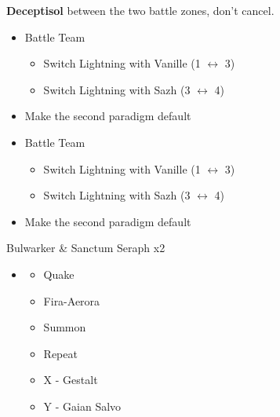 \begin{paracol}{2}
\textbf{Deceptisol} between the two battle zones, don't cancel.
\switchcolumn*
\begin{menu}
	\begin{itemize}
		\paradigm
		\begin{itemize}
			\item Battle Team
			      \begin{itemize}
				      \item Switch Lightning with Vanille (1 $\leftrightarrow$ 3)
				      \item Switch Lightning with Sazh (3 $\leftrightarrow$ 4)
			      \end{itemize}
			\item Make the second paradigm default
		\end{itemize}
	\end{itemize}
\end{menu}
\switchcolumn
\begin{menu}
	\begin{itemize}
		\paradigm
		\begin{itemize}
			\item Battle Team
			      \begin{itemize}
				      \item Switch Lightning with Vanille (1 $\leftrightarrow$ 3)
				      \item Switch Lightning with Sazh (3 $\leftrightarrow$ 4)
			      \end{itemize}
			\item Make the second paradigm default
		\end{itemize}
	\end{itemize}
\end{menu}
\switchcolumn*
\renewcommand{\second}{[2] Relentless Assault (\rav/\rav/\com)}
\begin{battle}{Bulwarker \& Sanctum Seraph x2}
	\begin{itemize}
		\item \second
		      \begin{itemize}
			      \item Quake
			      \item Fira-Aerora
			      \item Summon
			      \item Repeat
			      \item X - Gestalt
			      \item Y - Gaian Salvo
		      \end{itemize}
	\end{itemize}

\end{battle}
\end{paracol}
